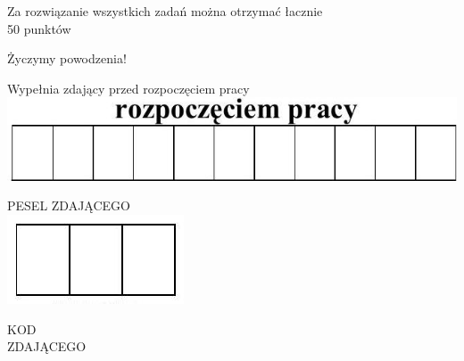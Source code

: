 \documentclass[10pt]{article}
\begin{document}
Za rozwiązanie wszystkich zadań można otrzymać łacznie\\
50 punktów

Życzymy powodzenia!

Wypełnia zdający przed rozpoczęciem pracy\\
\includegraphics[max width=\textwidth, center]{2024_11_21_99a977d92f90f1d0fb7fg-01}

PESEL ZDAJĄCEGO\\
\includegraphics[max width=\textwidth, center]{2024_11_21_99a977d92f90f1d0fb7fg-01(2)}

KOD\\
ZDAJĄCEGO
\end{document}
